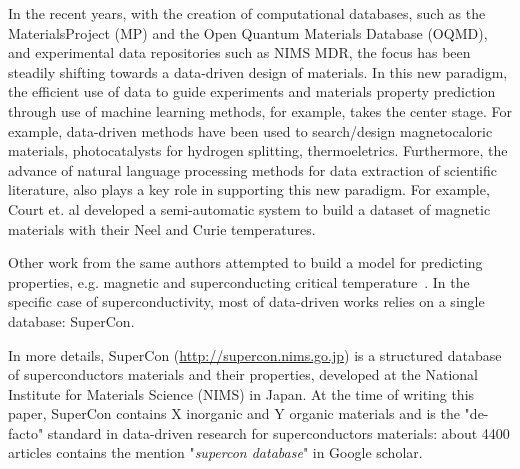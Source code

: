 \documentclass{article}
\begin{document}

In the recent years, with the creation of computational databases, such as the MaterialsProject (MP)\cite{materialsprojectJain2013} and the Open Quantum Materials Database (OQMD)\cite{oqmdkirklin2015open}, and experimental data repositories such as NIMS MDR, the focus has been steadily shifting towards a data-driven design of materials. In this new paradigm, the efficient use of data to guide experiments and materials property prediction through use of machine learning methods, for example, takes the center stage. 
For example, data-driven methods have been used to search/design magnetocaloric materials\cite{Bocarsly2017,Castro2020,court2021inverse}, photocatalysts for hydrogen splitting\cite{xiong2021optimizing}, thermoeletrics\cite{iwasaki2019machine}. Furthermore, the advance of natural language processing methods for data extraction of scientific literature, also plays a key role in supporting this new paradigm. For example, Court et. al \cite{court2018auto} developed a semi-automatic system to build a dataset of magnetic materials with their Neel and Curie temperatures. 

Other work from the same authors attempted to build a model for predicting properties, e.g. magnetic and superconducting critical temperature~\cite{court_magnetic_2020}. In the specific case of superconductivity, most of data-driven works relies on a single database: SuperCon\cite{stanev_machine_2017, le2020critical,Hamlin2019SuperconductivityNR}.

In more details, SuperCon (\url{http://supercon.nims.go.jp}) is a structured database of superconductors materials and their properties, developed at the National Institute for Materials Science (NIMS) in Japan. 
At the time of writing this paper, SuperCon contains  X inorganic and Y organic materials and is the "de-facto" standard in data-driven research for superconductors materials: about 4400 articles contains the mention "\textit{supercon database}" in Google scholar. 
\end{document}
